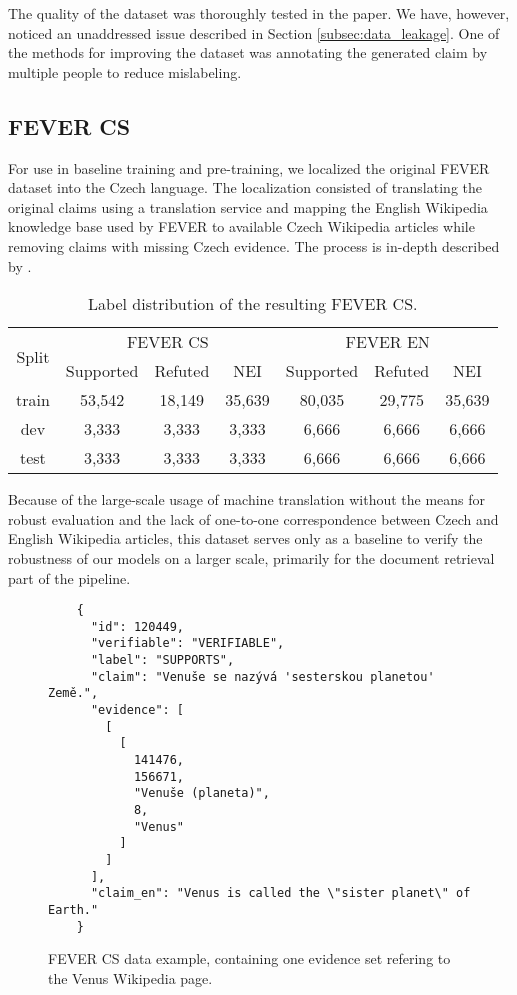 The quality of the dataset was thoroughly tested in the paper.
We have, however, noticed an unaddressed issue described in Section \ref{subsec:data_leakage}.
One of the methods for improving the dataset was annotating the generated claim by multiple people to reduce mislabeling.

\subsection{FEVER CS}

For use in baseline training and pre-training, we localized the original FEVER dataset into the Czech language. 
The localization consisted of translating the original claims using a translation service and mapping the English Wikipedia knowledge base used by FEVER to available Czech Wikipedia articles while removing claims with missing Czech evidence.
The process is in-depth described by \citet[Chapter 3]{ullrich}.

\begin{table}[h!]
    \centering
    \begin{tabular}{c || c c c || c c c}
        \multirow{2}{0.8cm}{Split} & \multicolumn{3}{c||}{FEVER CS} & \multicolumn{3}{c}{FEVER EN} \\
        & Supported & Refuted & NEI & Supported & Refuted & NEI\\
        \hline
        train & 53,542 & 18,149 & 35,639 & 80,035 & 29,775 & 35,639\\
        dev & 3,333 & 3,333 & 3,333 & 6,666 & 6,666 & 6,666 \\
        test & 3,333 & 3,333 & 3,333 & 6,666 & 6,666 & 6,666
    \end{tabular}
\caption[Fever CS Label Distribution]{Label distribution of the resulting FEVER CS.}
\end{table}

Because of the large-scale usage of machine translation without the means for robust evaluation and the lack of one-to-one correspondence between Czech and English Wikipedia articles, this dataset serves only as a baseline to verify the robustness of our models on a larger scale, primarily for the document retrieval part of the pipeline.

\begin{figure}[h!]
    \begin{framed}
    \begin{verbatim}
    {
      "id": 120449,
      "verifiable": "VERIFIABLE",
      "label": "SUPPORTS",
      "claim": "Venuše se nazývá 'sesterskou planetou' Země.",
      "evidence": [
        [
          [
            141476,
            156671,
            "Venuše (planeta)",
            8,
            "Venus"
          ]
        ]
      ],
      "claim_en": "Venus is called the \"sister planet\" of Earth."
    }\end{verbatim}
    \vspace{-0.4cm}
    \end{framed}
    \caption[FEVER CS Data Example]{FEVER CS data example, containing one evidence set refering to the Venus Wikipedia page.}
    \label{fig:fevercs_example}
\end{figure}

